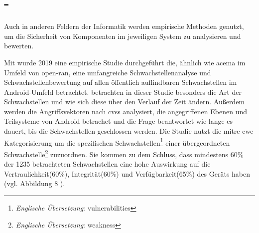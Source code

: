 \section{ - \citeauthor{mazuera-rozoAndroidOSStack2019}}
\label{sec:forschungsstand-android}
Auch in anderen Feldern der Informatik werden empirische Methoden genutzt, um die Sicherheit von Komponenten im jeweiligen System zu analysieren und bewerten.
\par Mit  wurde 2019 eine empirische Studie durchgeführt die, ähnlich wie \gls{acema} im Umfeld von \gls{open-ran}, eine umfangreiche Schwachstellenanalyse und Schwachstellenbewertung auf allen öffentlich auffindbaren Schwachstellen im Android-Umfeld betrachtet. \citeauthor{mazuera-rozoAndroidOSStack2019} betrachten in dieser Studie besonders die Art der Schwachstellen und wie sich diese über den Verlauf der Zeit ändern. Außerdem werden die Angriffsvektoren nach \gls{cvss} analysiert, die angegriffenen Ebenen und Teilsysteme von Android betrachet und die Frage beantwortet wie lange es dauert, bis die Schwachstellen geschlossen werden. Die Studie nutzt die \gls{mitre} \gls{cwe} Kategorisierung um die spezifischen Schwachstellen\footnote{\textit{Englische Übersetzung}: vulnerabilities} einer übergeordneten Schwachstelle\footnote{\textit{Englische Übersetzung}: weakness} zuzuordnen. Sie kommen zu dem Schluss, dass mindestens 60\% der 1235 betrachteten Schwachstellen eine hohe Auswirkung auf die Vertraulichkeit(60\%), Integrität(60\%) und Verfügbarkeit(65\%) des Geräts haben (vgl. Abbildung 8 \autocite{mazuera-rozoAndroidOSStack2019}). 